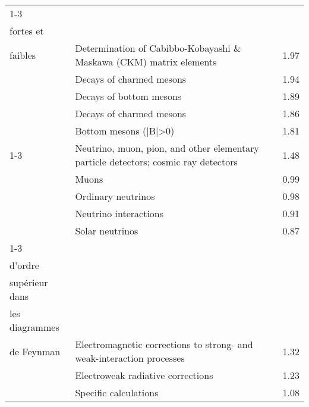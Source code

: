 \begin{longtable}[H]{p{}|p{}|p{}}
\cline{1-3}
\multirow{5}{*}{\begin{tabular}{l}Désintégrations\\ fortes et\\ faibles\end{tabular}} & Determination of Cabibbo-Kobayashi \& Maskawa (CKM) matrix elements &  1.97 \\
                                                                               & Decays of charmed mesons &  1.94 \\
                                                                               & Decays of bottom mesons &  1.89 \\
                                                                               & Decays of charmed mesons &  1.86 \\
                                                                               & Bottom mesons (|B|>0) &  1.81 \\
\cline{1-3}
\multirow{5}{*}{\begin{tabular}{l}Détecteurs\end{tabular}} & Neutrino, muon, pion, and other elementary particle detectors; cosmic ray detectors &  1.48 \\
                                                                               & Muons &  0.99 \\
                                                                               & Ordinary neutrinos &  0.98 \\
                                                                               & Neutrino interactions &  0.91 \\
                                                                               & Solar neutrinos &  0.87 \\
\cline{1-3}
\multirow{5}{*}{\begin{tabular}{l}Développements\\ d'ordre\\ supérieur dans\\ les diagrammes\\ de Feynman\end{tabular}} & Electromagnetic corrections to strong- and weak-interaction processes &  1.32 \\
                                                                               & Electroweak radiative corrections &  1.23 \\
                                                                               & Specific calculations &  1.08 \\

\end{longtable}
